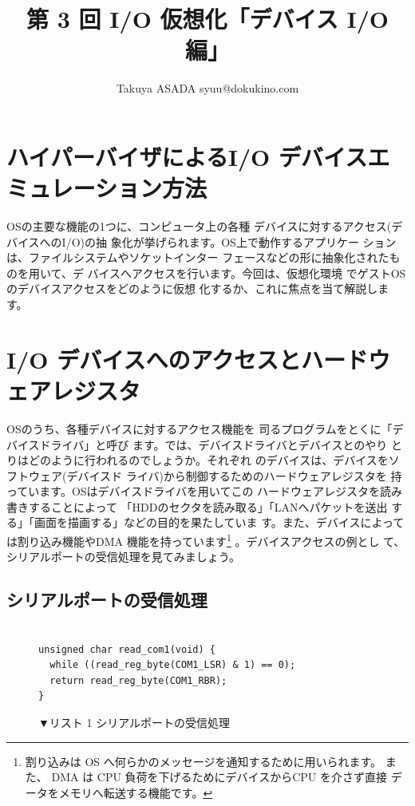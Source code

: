 \documentclass[a4j,12pt]{jarticle}
\title{第 3 回 I/O 仮想化「デバイス I/O 編」}
\author{Takuya ASADA syuu@dokukino.com}
\begin{document}
\maketitle

\section{ハイパーバイザによるI/O デバイスエミュレーション方法}

 OSの主要な機能の1つに、コンピュータ上の各種
デバイスに対するアクセス(デバイスへのI/O)の抽
象化が挙げられます。OS上で動作するアプリケー
ションは、ファイルシステムやソケットインター
フェースなどの形に抽象化されたものを用いて、デ
バイスへアクセスを行います。今回は、仮想化環境
でゲストOSのデバイスアクセスをどのように仮想
化するか、これに焦点を当て解説します。


\section{I/O デバイスへのアクセスとハードウェアレジスタ}

 OSのうち、各種デバイスに対するアクセス機能を
司るプログラムをとくに「デバイスドライバ」と呼び
ます。では、デバイスドライバとデバイスとのやり
とりはどのように行われるのでしょうか。それぞれ
のデバイスは、デバイスをソフトウェア(デバイスド
ライバ)から制御するためのハードウェアレジスタを
持っています。OSはデバイスドライバを用いてこの
ハードウェアレジスタを読み書きすることによって
「HDDのセクタを読み取る」「LANへパケットを送出
する」「画面を描画する」などの目的を果たしていま
す。また、デバイスによっては割り込み機能やDMA
機能を持っています\footnote[1]{
割り込みは OS へ何らかのメッセージを通知するために用いられます。
また、 DMA は CPU 負荷を下げるためにデバイスからCPU を介さず直接
データをメモリへ転送する機能です。
}
。デバイスアクセスの例とし
て、シリアルポートの受信処理を見てみましょう。

\subsection{シリアルポートの受信処理}

\begin{figure}
\begin{verbatim}

unsigned char read_com1(void) {
  while ((read_reg_byte(COM1_LSR) & 1) == 0);
  return read_reg_byte(COM1_RBR);
}

\end{verbatim}
\caption{▼リスト 1  シリアルポートの受信処理}
\end{figure}
\end{document}
